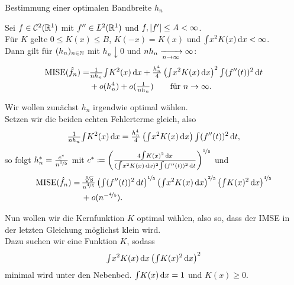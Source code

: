 \documentclass{cheat-sheet}
\newcommand{\Cont}{\mathcal{C}} %
\DeclareMathOperator{\MISE}{MISE} %
\begin{document}
\begin{ziel}
  Bestimmung einer optimalen Bandbreite $h_n$
\end{ziel}

\begin{satz}
  Sei $f \in \Cont^2(\R^1)$ mit $f'' \in L^2(\mathbb{R}^1)$ und $f, \lvert f'\rvert \leq A < \infty$. \\
  Für $K$ gelte $0 \leq K(x) \leq B$, $K(-x) = K(x)$ und ${\textstyle \int} x^2 K(x) \,\mathrm{d} x < \infty$. \\
  Dann gilt für $(h_n)_{n \in \mathbb{N}}$ mit $h_n \downarrow 0$ und $n h_n \xrightarrow[n \to \infty]{} \infty$:
  \begin{align*}
    \MISE(\hat{f}_n) = & \tfrac{1}{n h_n} \IInt{K^2(x)}{x} + \tfrac{h_n^4}{4} \left( \IInt{x^2 K(x)}{x} \right)^2 \IInt{(f''(t))^2}{t} \\
    & + o(h_n^4) + o(\tfrac{1}{n h_n}) \qquad
    \text{für } n \to \infty.
  \end{align*}
\end{satz}


\begin{bem}
  Wir wollen zunächst $h_n$ irgendwie optimal wählen. \\
  Setzen wir die beiden echten Fehlerterme gleich, also
  \[
    \tfrac{1}{n h_n} {\textstyle \int} K^2(x) \,\mathrm{d} x = \tfrac{h_n^4}{4} \left( {\textstyle \int} x^2 K(x) \,\mathrm{d} x \right) {\textstyle \int} (f''(t))^2 \,\mathrm{d} t,
  \]
  so folgt $h_n^{*} = \tfrac{c^*}{n^{\nicefrac{1}{5}}}$ mit $c^* \coloneqq \left( \frac{4 {\textstyle \int} K(x)^2 \,\mathrm{d} x}{({\textstyle \int} x^2 K(x) \,\mathrm{d} x)^2 {\textstyle \int} (f''(t))^2 \,\mathrm{d} t} \right)^{\nicefrac{1}{5}}$
  und
  \begin{align*}
    \MISE(\hat{f}_n) = \, & \tfrac{\sqrt[5]{8}}{n^{\nicefrac{4}{5}}} \left( \IInt{(f''(t))^2}{t} \right)^{\nicefrac{1}{5}} \left( \IInt{x^2 K(x)}{x} \right)^{\nicefrac{2}{5}} \left( \IInt{K(x)^2}{x} \right)^{\nicefrac{4}{5}} \\
    & + o(n^{- \nicefrac{4}{5}}).
  \end{align*}
\end{bem}

\begin{bem}
  Nun wollen wir die Kernfunktion $K$ optimal wählen, also so, dass der IMSE in der letzten Gleichung möglichst klein wird. \\
  Dazu suchen wir eine Funktion $K$, sodass
  \[
    {\textstyle \int} x^2 K(x) \,\mathrm{d} x \left( {\textstyle \int} K(x)^2 \,\mathrm{d} x \right)^2
  \]
  minimal wird unter den Nebenbed. ${\textstyle \int} K(x) \,\mathrm{d} x = 1$ und $K(x) \geq 0$.
\end{bem}
\end{document}
